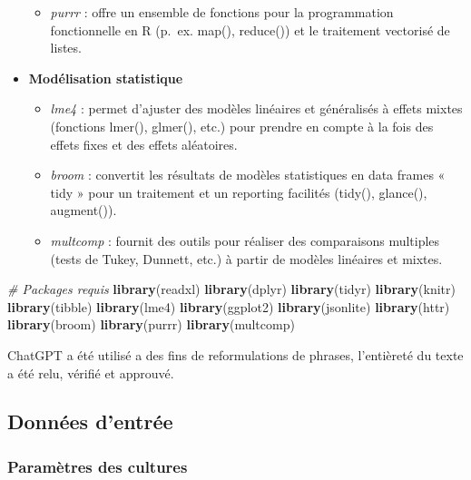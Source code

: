 \documentclass[
]{article}
\newenvironment{Shaded}{\begin{snugshade}}{\end{snugshade}}
\newcommand{\CommentTok}[1]{\textcolor[rgb]{0.56,0.35,0.01}{\textit{#1}}}
\newcommand{\FunctionTok}[1]{\textcolor[rgb]{0.13,0.29,0.53}{\textbf{#1}}}
\newcommand{\NormalTok}[1]{#1}
\providecommand{\tightlist}{%
  \setlength{\itemsep}{0pt}\setlength{\parskip}{0pt}}
\begin{document}
\begin{itemize}
  \begin{itemize}
  \tightlist
  \item
    \emph{purrr} : offre un ensemble de fonctions pour la programmation
    fonctionnelle en R (p.~ex. map(), reduce()) et le traitement
    vectorisé de listes.
  \end{itemize}
\item
  \textbf{Modélisation statistique}

  \begin{itemize}
  \item
    \emph{lme4} : permet d'ajuster des modèles linéaires et généralisés
    à effets mixtes (fonctions lmer(), glmer(), etc.) pour prendre en
    compte à la fois des effets fixes et des effets aléatoires.
  \item
    \emph{broom} : convertit les résultats de modèles statistiques en
    data frames « tidy » pour un traitement et un reporting facilités
    (tidy(), glance(), augment()).
  \item
    \emph{multcomp} : fournit des outils pour réaliser des comparaisons
    multiples (tests de Tukey, Dunnett, etc.) à partir de modèles
    linéaires et mixtes.
  \end{itemize}
\end{itemize}

\begin{Shaded}
\begin{Highlighting}[]
\CommentTok{\# Packages requis}
\FunctionTok{library}\NormalTok{(readxl)}
\FunctionTok{library}\NormalTok{(dplyr)}
\FunctionTok{library}\NormalTok{(tidyr)}
\FunctionTok{library}\NormalTok{(knitr)}
\FunctionTok{library}\NormalTok{(tibble)}
\FunctionTok{library}\NormalTok{(lme4)}
\FunctionTok{library}\NormalTok{(ggplot2)}
\FunctionTok{library}\NormalTok{(jsonlite)}
\FunctionTok{library}\NormalTok{(httr)}
\FunctionTok{library}\NormalTok{(broom)}
\FunctionTok{library}\NormalTok{(purrr)}
\FunctionTok{library}\NormalTok{(multcomp)}
\end{Highlighting}
\end{Shaded}

ChatGPT a été utilisé a des fins de reformulations de phrases,
l'entièreté du texte a été relu, vérifié et approuvé.

\subsection{Données d'entrée}\label{donnuxe9es-dentruxe9e}

\subsubsection{Paramètres des
cultures}\label{paramuxe8tres-des-cultures}
\end{document}
